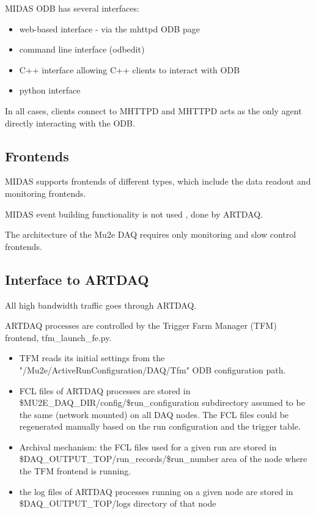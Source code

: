 MIDAS ODB has several interfaces:
\begin{itemize}
\item 
  web-based interface - via the mhttpd ODB page
\item
  command line interface (odbedit)
\item
  C++ interface allowing C++ clients to interact with ODB
\item
  python interface
\end{itemize}

In all cases, clients connect to MHTTPD and MHTTPD acts as
the only agent directly interacting with the ODB.

\subsection{Frontends}

MIDAS supports frontends of different types, which include the data readout and monitoring
frontends.

MIDAS event building functionality is not used , done by ARTDAQ.

The architecture of the Mu2e DAQ requires only monitoring and slow control frontends.


\subsection{Interface to ARTDAQ}
All high bandwidth traffic goes through ARTDAQ.

ARTDAQ processes are controlled by the Trigger Farm Manager (TFM) frontend,
tfm\_launch\_fe.py.

\begin{itemize}
\item 
  TFM reads its initial settings from the "/Mu2e/ActiveRunConfiguration/DAQ/Tfm"
  ODB configuration path.
\item
  FCL files of ARTDAQ processes are stored in \$MU2E\_DAQ\_DIR/config/\$run\_configuration
  subdirectory assumed to be the same (network mounted) on all DAQ nodes.
  The FCL files could be regenerated manually based on the run configuration and the trigger table.
\item
  Archival mechanism: the FCL files used for a given run are stored
  in \$DAQ\_OUTPUT\_TOP/run\_records/\$run\_number area of the node where the TFM frontend is running.
\item
  the log files of ARTDAQ processes running on a given node are stored in \$DAQ\_OUTPUT\_TOP/logs
  directory of that node
\end{itemize}

